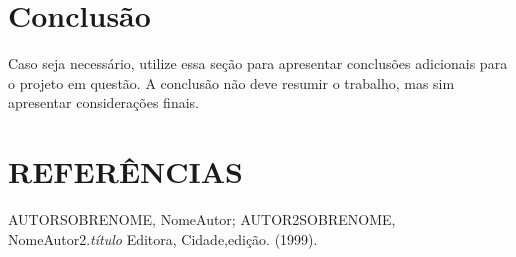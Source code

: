 \documentclass[a4paper,12pt]{article}
\begin{document}
\newpage
\section{Conclusão}
\label{sec:conclusao}
Caso seja necessário, utilize essa seção para apresentar conclusões adicionais para o projeto em questão. A conclusão não deve resumir o trabalho, mas sim apresentar considerações finais. 

\newpage
\section{REFERÊNCIAS}
\begingroup
\renewcommand{\section}[2]{}

\begin{thebibliography}{3} %

 AUTORSOBRENOME, NomeAutor; AUTOR2SOBRENOME, NomeAutor2.\textit{título} Editora, Cidade,edição. (1999).

\end{thebibliography}
\end{document}

